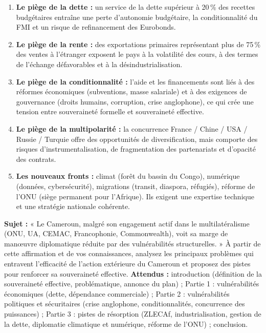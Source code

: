 \documentclass[11pt]{article}
\begin{document}
\begin{aretenir}
\begin{enumerate}
    \item \textbf{Le piège de la dette :} un service de la dette supérieur à 20\,\% des recettes budgétaires entraîne une perte d'autonomie budgétaire, la conditionnalité du FMI et un risque de refinancement des Eurobonds.
    \item \textbf{Le piège de la rente :} des exportations primaires représentant plus de 75\,\% des ventes à l'étranger exposent le pays à la volatilité des cours, à des termes de l'échange défavorables et à la désindustrialisation.
    \item \textbf{Le piège de la conditionnalité :} l'aide et les financements sont liés à des réformes économiques (subventions, masse salariale) et à des exigences de gouvernance (droits humains, corruption, crise anglophone), ce qui crée une tension entre souveraineté formelle et souveraineté effective.
    \item \textbf{Le piège de la multipolarité :} la concurrence France / Chine / USA / Russie / Turquie offre des opportunités de diversification, mais comporte des risques d'instrumentalisation, de fragmentation des partenariats et d'opacité des contrats.
    \item \textbf{Les nouveaux fronts :} climat (forêt du bassin du Congo), numérique (données, cybersécurité), migrations (transit, diaspora, réfugiés), réforme de l'ONU (siège permanent pour l'Afrique). Ils exigent une expertise technique et une stratégie nationale cohérente.
\end{enumerate}
\end{aretenir}

\begin{exercice}
\textbf{Sujet :} « Le Cameroun, malgré son engagement actif dans le multilatéralisme (ONU, UA, CEMAC, Francophonie, Commonwealth), voit sa marge de manœuvre diplomatique réduite par des vulnérabilités structurelles. »
À partir de cette affirmation et de vos connaissances, analysez les principaux problèmes qui entravent l'efficacité de l'action extérieure du Cameroun et proposez des pistes pour renforcer sa souveraineté effective.
\textbf{Attendus :} introduction (définition de la souveraineté effective, problématique, annonce du plan) ; Partie 1 : vulnérabilités économiques (dette, dépendance commerciale) ; Partie 2 : vulnérabilités politiques et sécuritaires (crise anglophone, conditionnalités, concurrence des puissances) ; Partie 3 : pistes de résorption (ZLECAf, industrialisation, gestion de la dette, diplomatie climatique et numérique, réforme de l'ONU) ; conclusion.
\end{exercice}
\end{document}
